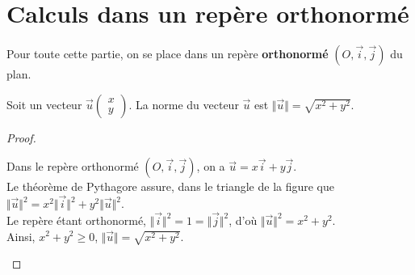 \newpage

\section{Calculs dans un repère orthonormé}
Pour toute cette partie, on se place dans un repère {\bf{orthonormé}} $(O,\overrightarrow{i},\overrightarrow{j})$ du plan. 
\begin{Propriété}
Soit un vecteur $\overrightarrow{u}\begin{pmatrix} 
x \\
y
 \end{pmatrix}$. La norme du vecteur $\overrightarrow{u}$ est $\Vert \overrightarrow{u} \Vert=\sqrt{x^2+y^2}$.

\end{Propriété}

\begin{proof}~\\
\begin{minipage}[c]{0.65\linewidth}
Dans le repère orthonormé $(O,\overrightarrow{i},\overrightarrow{j})$, on a $\overrightarrow{u}=x\overrightarrow{i}+y\overrightarrow{j}$. \\Le théorème de Pythagore assure, dans le triangle de la figure que \\$\Vert \overrightarrow{u} \Vert ^2=x^2\Vert \overrightarrow{i} \Vert^2+y^2\Vert \overrightarrow{u} \Vert^2$. \\
Le repère étant orthonormé, $\Vert \overrightarrow{i} \Vert^2=1=\Vert \overrightarrow{j} \Vert^2$, d'où $\Vert \overrightarrow{u} \Vert ^2=x^2+y^2$.\\ Ainsi, $x^2+y^2\geq 0$, $\Vert \overrightarrow{u} \Vert=\sqrt{x^2+y^2}$.
\end{minipage} \hfill
\begin{minipage}[c]{0.35\linewidth}
\begin{center}
\end{center}
\end{minipage}
\end{proof}
